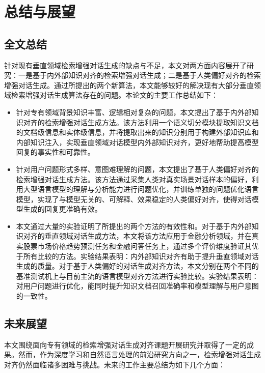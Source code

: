 \chapter{总结与展望}

\section{全文总结}

针对现有垂直领域检索增强对话生成的缺点与不足，本文对两方面内容展开了研究：一是基于内外部知识对齐的检索增强对话生成；二是基于人类偏好对齐的检索增强对话生成。通过所提出的两个新算法，本文能够较好的解决现有大部分垂直领域检索增强对话生成算法存在的问题。本论文的主要工作总结如下：

\begin{itemize}[topsep = 0 pt, itemsep= 0 pt, parsep=0pt, partopsep=0pt, leftmargin=20pt, itemindent=0pt, labelsep=6pt, listparindent=24pt]
	\item 针对专有领域背景知识丰富、逻辑相对复杂的问题，本文提出了基于内外部知识对齐的检索增强对话生成方法。该方法利用一个语义切分模块提取知识文档的文档级信息和实体级信息，并将提取出来的知识分别用于构建外部知识库和内部知识注入，实现垂直领域对话模型内外部知识对齐，更好地帮助提高模型回复的事实性和可靠性。

	\item 针对用户问题形式多样、意图难理解的问题，本文提出了基于人类偏好对齐的检索增强对话生成方法。该方法通过采集人类对真实场景对话样本的偏好，利用大型语言模型的理解与分析能力进行问题优化，并训练单独的问题优化语言模型，实现了与模型无关的、可解释、效果稳定的人类偏好对齐，使得对话模型生成的回复更准确有效。
	
    \item 本文通过大量的实验证明了所提出的两个方法的有效性和。对于基于内外部知识对齐的垂直领域对话生成方法，本文将该方法应用于金融分析领域，并在真实股票市场价格趋势预测任务和金融问答任务上，通过多个评价维度验证其优于所有比较的方法。实验结果表明：内外部知识对齐有助于提升垂直领域对话生成的质量。对于基于人类偏好的对话生成对齐方法，本文分别在两个不同的基准测试机上与目前主流的语言模型对齐方法进行实验比较。实验结果表明：对用户问题进行优化，能同时提升知识文档召回准确率和模型理解与用户意图的一致性。
\end{itemize}

\section{未来展望}

本文围绕面向专有领域的检索增强对话生成对齐课题开展研究并取得了一定的成果。然而，作为深度学习和自然语言处理的前沿研究方向之一，检索增强对话生成对齐仍然面临诸多困难与挑战。未来的工作主要总结为如下几个方面：

